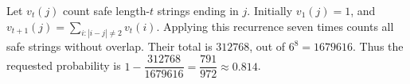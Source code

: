 Let $v_t(j)$ count safe length-$t$ strings ending in $j$. Initially $v_1(j)=1$, and $v_{t+1}(j)=\sum_{i:|i-j|\ne2}v_t(i)$. Applying this recurrence seven times counts all safe strings without overlap. Their total is $312768$, out of $6^8=1679616$. Thus the requested probability is $1-\dfrac{312768}{1679616}=\dfrac{791}{972}\approx\boxed{0.814}$.
